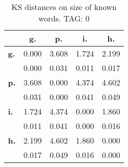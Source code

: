 \begin{table}[h!]
\begin{center}
\begin{tabular}{| l || c | c | c | c |}\hline
 & {\bf g.} & {\bf p.} & {\bf i.} & {\bf h.} \\\hline\hline
{\bf g.} & 0.000 & 3.608 & 1.724 & 2.199 \\
{\bf } & 0.000 & 0.031 & 0.011 & 0.017 \\\hline
{\bf p.} & 3.608 & 0.000 & 4.374 & 4.602 \\
{\bf } & 0.031 & 0.000 & 0.041 & 0.049 \\\hline
{\bf i.} & 1.724 & 4.374 & 0.000 & 1.860 \\
{\bf } & 0.011 & 0.041 & 0.000 & 0.016 \\\hline
{\bf h.} & 2.199 & 4.602 & 1.860 & 0.000 \\
{\bf } & 0.017 & 0.049 & 0.016 & 0.000 \\\hline
\end{tabular}
\caption{KS distances on size of known words. TAG: 0}
\end{center}
\end{table}